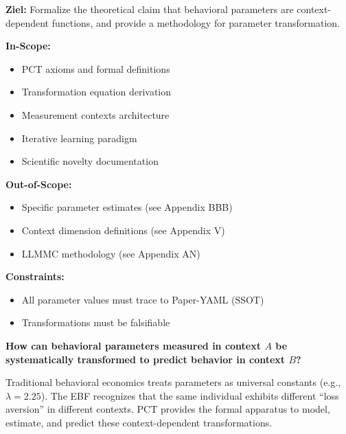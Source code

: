 
\begin{tcolorbox}[colback=gray!5!white, colframe=gray!75!black, title=Appendix Scope]
\textbf{Ziel:} Formalize the theoretical claim that behavioral parameters are
context-dependent functions, and provide a methodology for parameter transformation.

\textbf{In-Scope:}
\begin{itemize}
    \item PCT axioms and formal definitions
    \item Transformation equation derivation
    \item Measurement contexts architecture
    \item Iterative learning paradigm
    \item Scientific novelty documentation
\end{itemize}

\textbf{Out-of-Scope:}
\begin{itemize}
    \item Specific parameter estimates (see Appendix BBB)
    \item Context dimension definitions (see Appendix V)
    \item LLMMC methodology (see Appendix AN)
\end{itemize}

\textbf{Constraints:}
\begin{itemize}
    \item All parameter values must trace to Paper-YAML (SSOT)
    \item Transformations must be falsifiable
\end{itemize}
\end{tcolorbox}


\begin{tcolorbox}[colback=fadarkblue!10!white, colframe=fadarkblue,
    title=\textbf{Fundamental Question}]
\large
\textbf{How can behavioral parameters measured in context $A$ be systematically
transformed to predict behavior in context $B$?}
\normalsize

\vspace{0.5em}
Traditional behavioral economics treats parameters as universal constants
(e.g., $\lambda = 2.25$). The EBF recognizes that the same individual exhibits
different ``loss aversion'' in different contexts. PCT provides the formal
apparatus to model, estimate, and predict these context-dependent transformations.
\end{tcolorbox}


